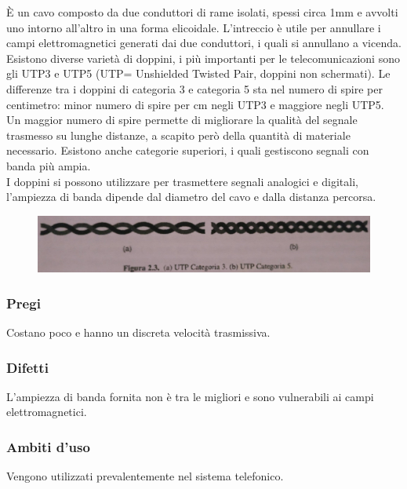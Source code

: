 È un cavo composto da due conduttori di rame isolati, spessi circa 1mm e avvolti uno intorno all’altro in una forma elicoidale.
L’intreccio è utile per annullare i campi elettromagnetici generati dai due conduttori, i quali si annullano a vicenda.
Esistono diverse varietà di doppini, i più importanti per le telecomunicazioni sono gli UTP3 e UTP5 (UTP= Unshielded Twisted Pair, doppini non schermati).
Le differenze tra i doppini di categoria 3 e categoria 5 sta nel numero di spire per centimetro: minor numero di spire per cm negli UTP3 e maggiore negli UTP5.
Un maggior numero di spire permette di migliorare la qualità del segnale trasmesso su lunghe distanze, a scapito però della quantità di materiale necessario.
Esistono anche categorie superiori, i quali gestiscono segnali con banda più ampia.  \\
I doppini si possono utilizzare per trasmettere segnali analogici e digitali, l’ampiezza di banda dipende dal diametro del cavo e dalla distanza percorsa.

\begin{figure}[H]
\centering
\includegraphics[scale=0.7]{res/img/3_Doppino.jpg}
\end{figure}


\subsubsection{Pregi}
Costano poco e hanno un discreta velocità trasmissiva.

\subsubsection{Difetti}
L'ampiezza di banda fornita non è tra le migliori e sono vulnerabili ai campi elettromagnetici.

\subsubsection{Ambiti d'uso}
Vengono utilizzati prevalentemente nel sistema telefonico.

